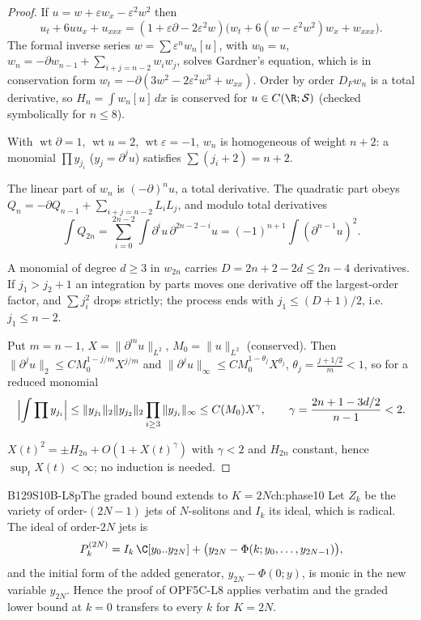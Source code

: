 \begin{proof}
If $u=w+\varepsilon w_x-\varepsilon^2w^2$ then
\[
u_t+6uu_x+u_{xxx}=(1+\varepsilon\partial-2\varepsilon^2w)\bigl(w_t+6(w-\varepsilon^2w^2)w_x+w_{xxx}\bigr).
\]
The formal inverse series $w=\sum\varepsilon^nw_n[u]$, with $w_0=u$, $w_n=-\partial w_{n-1}+\sum_{i+j=n-2}w_iw_j$, solves Gardner's equation, which is in conservation form $w_t=-\partial(3w^2-2\varepsilon^2w^3+w_{xx})$. Order by order $D_Fw_n$ is a total derivative, so $H_n=\int w_n[u]\,dx$ is conserved for $u\in C(\R;\mathcal S)$ (checked symbolically for $n\le8$).

With $\operatorname{wt}\partial=1$, $\operatorname{wt}u=2$, $\operatorname{wt}\varepsilon=-1$, $w_n$ is homogeneous of weight $n+2$: a monomial $\prod y_{j_i}$ ($y_j=\partial^ju$) satisfies $\sum(j_i+2)=n+2$.

The linear part of $w_n$ is $(-\partial)^nu$, a total derivative. The quadratic part obeys $Q_n=-\partial Q_{n-1}+\sum_{i+j=n-2}L_iL_j$, and modulo total derivatives
\[
\int Q_{2n}=\sum_{i=0}^{2n-2}\int\partial^iu\,\partial^{2n-2-i}u=(-1)^{n+1}\int(\partial^{n-1}u)^2.
\]

A monomial of degree $d\ge3$ in $w_{2n}$ carries $D=2n+2-2d\le2n-4$ derivatives. If $j_1>j_2+1$ an integration by parts moves one derivative off the largest-order factor, and $\sum j_i^2$ drops strictly; the process ends with $j_1\le(D+1)/2$, i.e.\ $j_1\le n-2$.

Put $m=n-1$, $X=\|\partial^mu\|_{L^2}$, $M_0=\|u\|_{L^2}$ (conserved). Then $\|\partial^ju\|_{2}\le CM_0^{1-j/m}X^{j/m}$ and $\|\partial^ju\|_\infty\le CM_0^{1-\theta_j}X^{\theta_j}$, $\theta_j=\frac{j+1/2}m<1$, so for a reduced monomial
\[
\Bigl|\int\prod y_{j_i}\Bigr|\le\|y_{j_1}\|_2\|y_{j_2}\|_2\prod_{i\ge3}\|y_{j_i}\|_\infty\le C(M_0)X^\gamma,\qquad \gamma=\frac{2n+1-3d/2}{n-1}<2.
\]

$X(t)^2=\pm H_{2n}+O(1+X(t)^\gamma)$ with $\gamma<2$ and $H_{2n}$ constant, hence $\sup_tX(t)<\infty$; no induction is needed.

\end{proof}

\begin{dimcard}{B129}{S10B-L8p}{The graded bound extends to $K=2N$}{\pw}{ch:phase10}
Let $Z_k$ be the variety of order-$(2N-1)$ jets of $N$-solitons and $I_k$ its ideal, which is radical. The ideal of order-$2N$ jets is
\[
P_k^{(2N)}=I_k\,\C[y_0..y_{2N}]+\bigl(y_{2N}-\Phi(k;y_0,\dots,y_{2N-1})\bigr),
\]
and the initial form of the added generator, $y_{2N}-\Phi(0;y)$, is monic in the new variable $y_{2N}$. Hence the proof of OPF5C-L8 applies verbatim and the graded lower bound at $k=0$ transfers to every $k$ for $K=2N$.
\end{dimcard}

